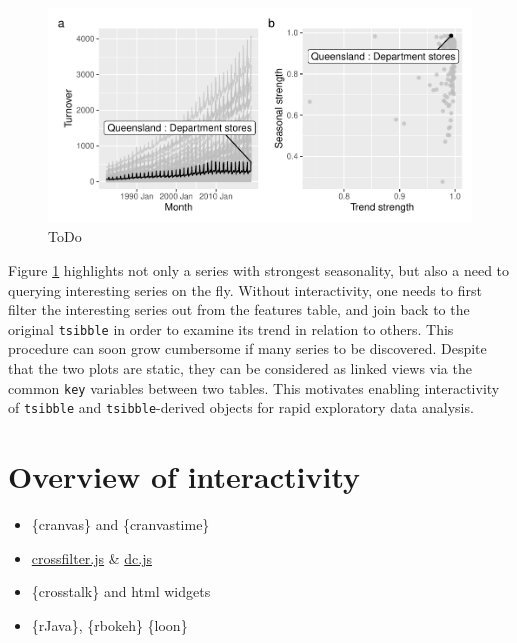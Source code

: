 \begin{Schunk}
\begin{figure}

{\centering \includegraphics[width=\textwidth]{figure/highlight-retail-1} 

}

\caption[ToDo]{ToDo}\label{fig:highlight-retail}
\end{figure}
\end{Schunk}

Figure \ref{fig:highlight-retail} highlights not only a series with
strongest seasonality, but also a need to querying interesting series on
the fly. Without interactivity, one needs to first filter the
interesting series out from the features table, and join back to the
original \texttt{tsibble} in order to examine its trend in relation to
others. This procedure can soon grow cumbersome if many series to be
discovered. Despite that the two plots are static, they can be
considered as linked views via the common \texttt{key} variables between
two tables. This motivates enabling interactivity of \texttt{tsibble}
and \texttt{tsibble}-derived objects for rapid exploratory data
analysis.

\hypertarget{overview-of-interactivity}{%
\section{Overview of interactivity}\label{overview-of-interactivity}}

\begin{itemize}
\tightlist
\item
  \{cranvas\} and \{cranvastime\}
\item
  \href{http://crossfilter.github.io/crossfilter/}{crossfilter.js} \&
  \href{https://dc-js.github.io/dc.js/}{dc.js}
\item
  \{crosstalk\} and html widgets
\item
  \{rJava\}, \{rbokeh\} \{loon\}
\end{itemize}

